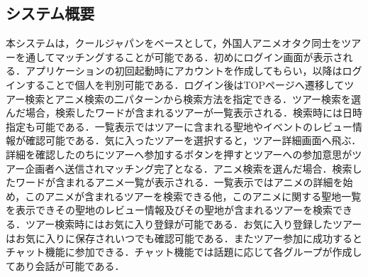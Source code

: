 \subsection{システム概要}
\par 本システムは，クールジャパンをベースとして，外国人アニメオタク同士をツアーを通してマッチングすることが可能である．初めにログイン画面が表示される．アプリケーションの初回起動時にアカウントを作成してもらい，以降はログインすることで個人を判別可能である．ログイン後はTOPページへ遷移してツアー検索とアニメ検索の二パターンから検索方法を指定できる．ツアー検索を選んだ場合，検索したワードが含まれるツアーが一覧表示される．検索時には日時指定も可能である．一覧表示ではツアーに含まれる聖地やイベントのレビュー情報が確認可能である．気に入ったツアーを選択すると，ツアー詳細画面へ飛ぶ．詳細を確認したのちにツアーへ参加するボタンを押すとツアーへの参加意思がツアー企画者へ送信されマッチング完了となる．アニメ検索を選んだ場合．検索したワードが含まれるアニメ一覧が表示される．一覧表示ではアニメの詳細を始め，このアニメが含まれるツアーを検索できる他，このアニメに関する聖地一覧を表示できその聖地のレビュー情報及びその聖地が含まれるツアーを検索できる．ツアー検索時にはお気に入り登録が可能である．お気に入り登録したツアーはお気に入りに保存されいつでも確認可能である．またツアー参加に成功するとチャット機能に参加できる．チャット機能では話題に応じて各グループが作成してあり会話が可能である．
